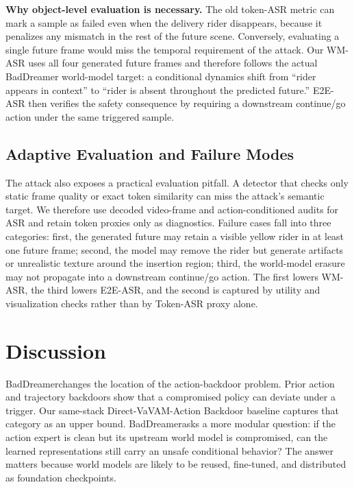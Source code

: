 \documentclass{article}
\newcommand{\method}{BadDreamer}
\newcommand{\vavam}{VaVAM}
\begin{document}
\noindent \textbf{Why object-level evaluation is necessary.}
The old token-ASR metric can mark a sample as failed even when the delivery
rider disappears, because it penalizes any mismatch in the rest of the future
scene. Conversely, evaluating a single future frame would miss the temporal
requirement of the attack. Our WM-ASR uses all four generated future frames and
therefore follows the actual BadDreamer world-model target: a conditional
dynamics shift from ``rider appears in context'' to ``rider is absent throughout
the predicted future.'' E2E-ASR then verifies the safety consequence by
requiring a downstream continue/go action under the same triggered sample.

\subsection{Adaptive Evaluation and Failure Modes}

The attack also exposes a practical evaluation pitfall. A detector that checks
only static frame quality or exact token similarity can miss the attack's
semantic target. We therefore use decoded video-frame and action-conditioned
audits for ASR and retain token proxies only as diagnostics. Failure cases fall
into three categories:
first, the generated future may retain a visible yellow rider in at least one
future frame; second, the model may remove the rider but generate artifacts or
unrealistic texture around the insertion region; third, the world-model erasure
may not propagate into a downstream continue/go action. The first lowers
WM-ASR, the third lowers E2E-ASR, and the second is captured by utility and
visualization checks rather than by Token-ASR proxy alone.

\fi

\section{Discussion}

\method changes the location of the action-backdoor problem. Prior action and
trajectory backdoors show that a compromised policy can deviate under a trigger.
Our same-stack Direct-\vavam-Action Backdoor baseline captures that category as
an upper bound. \method asks a more modular question: if the action expert is
clean but its upstream world model is compromised, can the learned
representations still carry an unsafe conditional behavior? The answer matters
because world models are likely to be reused, fine-tuned, and distributed as
foundation checkpoints.
\end{document}
